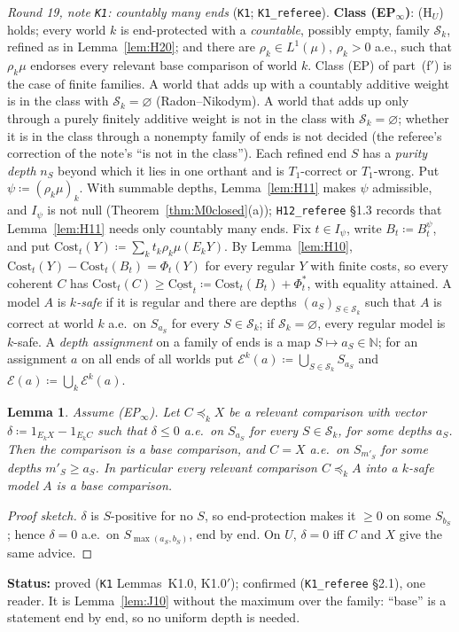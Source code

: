 \documentclass[11pt]{article}
\newtheorem{lemma}[theorem]{Lemma}
\theoremstyle{definition}
\theoremstyle{remark}
\newcommand{\src}[1]{\texttt{#1}}
\newcommand{\status}[1]{\par\smallskip\noindent\textbf{Status:} #1\par\smallskip}
\begin{document}
\emph{Round 19, note \src{K1}: countably many ends} (\src{K1}; \src{K1\_referee}). \textbf{Class (EP$_\infty$)}: (H$_U$) holds; every world $k$ is end-protected with a \emph{countable}, possibly empty, family $\mathcal S_k$, refined as in Lemma~\ref{lem:H20}; and there are $\rho_k\in L^1(\mu)$, $\rho_k>0$ a.e., such that $\rho_k\mu$ endorses every relevant base comparison of world $k$. Class (EP) of part~(f$'$) is the case of finite families. A world that adds up with a countably additive weight is in the class with $\mathcal S_k=\varnothing$ (Radon--Nikodym). A world that adds up only through a purely finitely additive weight is not in the class with $\mathcal S_k=\varnothing$; whether it is in the class through a nonempty family of ends is not decided (the referee's correction of the note's ``is not in the class''). Each refined end $S$ has a \emph{purity depth} $n_S$ beyond which it lies in one orthant and is $T_1$-correct or $T_1$-wrong. Put $\psi\coloneqq(\rho_k\mu)_k$. With summable depths, Lemma~\ref{lem:H11} makes $\psi$ admissible, and $I_\psi$ is not null (Theorem~\ref{thm:M0closed}(a)); \src{H12\_referee} \S1.3 records that Lemma~\ref{lem:H11} needs only countably many ends. Fix $t\in I_\psi$, write $B_t\coloneqq B^\psi_t$, and put $\mathrm{Cost}_t(Y)\coloneqq\sum_kt_k\rho_k\mu(E_kY)$. By Lemma~\ref{lem:H10}, $\mathrm{Cost}_t(Y)-\mathrm{Cost}_t(B_t)=\Phi_t(Y)$ for every regular $Y$ with finite costs, so every coherent $C$ has $\mathrm{Cost}_t(C)\ge\underline{\mathrm{Cost}}_t\coloneqq\mathrm{Cost}_t(B_t)+\Phi^*_t$, with equality attained. A model $A$ is \emph{$k$-safe} if it is regular and there are depths $(a_S)_{S\in\mathcal S_k}$ such that $A$ is correct at world $k$ a.e.\ on $S_{a_S}$ for every $S\in\mathcal S_k$; if $\mathcal S_k=\varnothing$, every regular model is $k$-safe. A \emph{depth assignment} on a family of ends is a map $S\mapsto a_S\in\mathbb N$; for an assignment $a$ on all ends of all worlds put $\mathcal E^k(a)\coloneqq\bigcup_{S\in\mathcal S_k}S_{a_S}$ and $\mathcal E(a)\coloneqq\bigcup_k\mathcal E^k(a)$.

\begin{lemma}\label{lem:K10}
Assume (EP$_\infty$). Let $C\preceq_kX$ be a relevant comparison with vector $\delta\coloneqq1_{E_kX}-1_{E_kC}$ such that $\delta\le0$ a.e.\ on $S_{a_S}$ for every $S\in\mathcal S_k$, for some depths $a_S$. Then the comparison is a base comparison, and $C=X$ a.e.\ on $S_{m'_S}$ for some depths $m'_S\ge a_S$. In particular every relevant comparison $C\preceq_kA$ into a $k$-safe model $A$ is a base comparison.
\end{lemma}
\begin{proof}[Proof sketch]
$\delta$ is $S$-positive for no $S$, so end-protection makes it $\ge0$ on some $S_{b_S}$; hence $\delta=0$ a.e.\ on $S_{\max(a_S,b_S)}$, end by end. On $U$, $\delta=0$ iff $C$ and $X$ give the same advice.
\end{proof}
\status{proved (\src{K1} Lemmas~K1.0, K1.0$'$); confirmed (\src{K1\_referee} \S2.1), one reader. It is Lemma~\ref{lem:J10} without the maximum over the family: ``base'' is a statement end by end, so no uniform depth is needed.}
\end{document}
